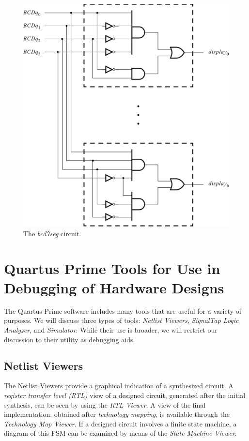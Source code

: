\documentclass[11pt, twoside, pdftex]{article}
\begin{document}
\clearpage
\begin{figure}[H]
   \begin{center}
      \includegraphics[scale=1]{figures/figure13.png}
   \caption{The {\it bcd7seg} circuit.} 
	 \label{fig:13}
	 \end{center}
\end{figure}

\section{Quartus\textsuperscript{\textregistered} Prime Tools for Use in Debugging of Hardware Designs}
The Quartus Prime software includes many tools that are useful for a variety
of purposes. We will discuss three types of tools: {\it Netlist Viewers},
{\it SignalTap Logic Analyzer}, and {\it Simulator}. 
While their use is broader, we will restrict
our discussion to their utility as debugging aids.

\subsection{Netlist Viewers}
The Netlist Viewers provide a graphical indication of a synthesized circuit.
A {\it register transfer level (RTL)} view of a designed circuit, generated after the
initial synthesis, can be seen by using the {\it RTL Viewer}. A view of the final 
implementation, obtained after {\it technology mapping}, is available through the
{\it Technology Map Viewer}. If a designed circuit involves a finite state machine,
a diagram of this FSM can be examined by means of the {\it State Machine Viewer}.
\end{document}
